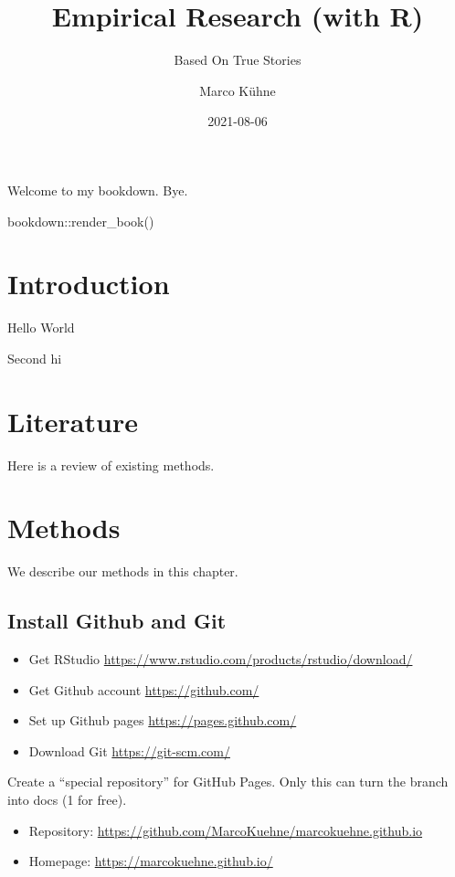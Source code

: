 \documentclass[
]{book}
\title{Empirical Research (with R)}
\subtitle{Based On True Stories}
\author{Marco Kühne}
\date{2021-08-06}
\providecommand{\tightlist}{%
  \setlength{\itemsep}{0pt}\setlength{\parskip}{0pt}}
\begin{document}
\maketitle

{
\setcounter{tocdepth}{1}
\tableofcontents
}
Welcome to my bookdown. Bye.

bookdown::render\_book()

\hypertarget{introduction}{%
\chapter{Introduction}\label{introduction}}

Hello World

Second hi

\hypertarget{literature}{%
\chapter{Literature}\label{literature}}

Here is a review of existing methods.

\hypertarget{methods}{%
\chapter{Methods}\label{methods}}

We describe our methods in this chapter.

\hypertarget{install-github-and-git}{%
\section{Install Github and Git}\label{install-github-and-git}}

\begin{itemize}
\tightlist
\item
  Get RStudio \url{https://www.rstudio.com/products/rstudio/download/}
\item
  Get Github account \url{https://github.com/}
\item
  Set up Github pages \url{https://pages.github.com/}
\item
  Download Git \url{https://git-scm.com/}
\end{itemize}

Create a ``special repository'' for GitHub Pages. Only this can turn the branch into docs (1 for free).

\begin{itemize}
\tightlist
\item
  Repository: \url{https://github.com/MarcoKuehne/marcokuehne.github.io}
\item
  Homepage: \url{https://marcokuehne.github.io/}
\end{itemize}
\end{document}
